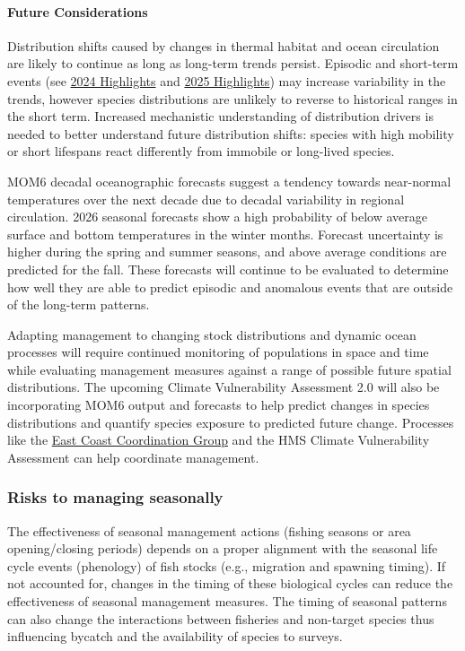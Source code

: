 \documentclass[
  10pt,
]{article}
\begin{document}
\paragraph{Future Considerations}\label{future-considerations}

Distribution shifts caused by changes in thermal habitat and ocean circulation are likely to continue as long as long-term trends persist. Episodic and short-term events (see \href{https://noaa-edab.github.io/catalog/observation_synthesis_2024.html}{2024 Highlights} and \hyperref[highlights]{2025 Highlights}) may increase variability in the trends, however species distributions are unlikely to reverse to historical ranges in the short term. Increased mechanistic understanding of distribution drivers is needed to better understand future distribution shifts: species with high mobility or short lifespans react differently from immobile or long-lived species.

MOM6 decadal oceanographic forecasts suggest a tendency towards near-normal temperatures over the next decade due to decadal variability in regional circulation. 2026 seasonal forecasts show a high probability of below average surface and bottom temperatures in the winter months. Forecast uncertainty is higher during the spring and summer seasons, and above average conditions are predicted for the fall. These forecasts will continue to be evaluated to determine how well they are able to predict episodic and anomalous events that are outside of the long-term patterns.

Adapting management to changing stock distributions and dynamic ocean processes will require continued monitoring of populations in space and time while evaluating management measures against a range of possible future spatial distributions. The upcoming Climate Vulnerability Assessment 2.0 will also be incorporating MOM6 output and forecasts to help predict changes in species distributions and quantify species exposure to predicted future change. Processes like the \href{https://www.mafmc.org/e3cg}{East Coast Coordination Group} and the HMS Climate Vulnerability Assessment can help coordinate management.

\subsubsection{Risks to managing seasonally}\label{risks-to-managing-seasonally}

The effectiveness of seasonal management actions (fishing seasons or area opening/closing periods) depends on a proper alignment with the seasonal life cycle events (phenology) of fish stocks (e.g., migration and spawning timing). If not accounted for, changes in the timing of these biological cycles can reduce the effectiveness of seasonal management measures. The timing of seasonal patterns can also change the interactions between fisheries and non-target species thus influencing bycatch and the availability of species to surveys.
\end{document}
